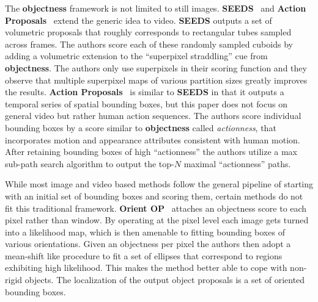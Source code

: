 The {\bf objectness} framework is not limited to still images. {\bf SEEDS}~\cite{Bergh:etal:ICCV13} and {\bf Action Proposals}~\cite{Yu:etal:CVPR15} extend the generic idea to video. {\bf SEEDS} outputs a set of volumetric proposals that roughly corresponds to rectangular tubes sampled across frames.  The authors score each of these randomly sampled cuboids by adding a volumetric extension to the ``superpixel straddling'' cue from {\bf objectness}. The authors only use superpixels in their scoring function and they observe that multiple superpixel maps of various partition sizes greatly improves the results. {\bf Action Proposals}~\cite{Yu:etal:CVPR15} is similar to {\bf SEEDS} in that it outputs a temporal series of spatial bounding boxes, but this paper does not focus on general video but rather human action sequences. The authors score individual bounding boxes by a score similar to  {\bf objectness} called \emph{actionness}, that incorporates motion and appearance attributes consistent with human motion. After retaining bounding boxes of high ``actionness'' the authors utilize a max sub-path search algorithm to output the top-$N$ maximal ``actionness'' paths. 

While most image and video based methods follow the general pipeline of starting with an initial set of bounding boxes and scoring them, certain methods do not fit this traditional framework. {\bf Orient OP}~\cite{He:Lau:ICCV15} attaches an objectness score to each pixel rather than window. By operating at the pixel level each image gets turned into a likelihood map, which is then amenable to fitting bounding boxes of various orientations. Given an objectness per pixel the authors then adopt a mean-shift like procedure to fit a set of ellipses that correspond to regions exhibiting high likelihood. This makes the method better able to cope with non-rigid objects. The localization of the output object proposals is a set of oriented bounding boxes.






